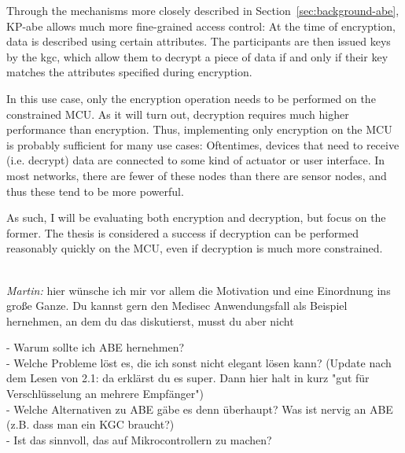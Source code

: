 Through the mechanisms more closely described in Section~\ref{sec:background-abe}, KP-\acrshort{abe} allows much more fine-grained access control:
At the time of encryption, data is described using certain \glspl{attribute}.
The participants are then issued keys by the \acrfull{kgc}, which allow them to decrypt a piece of data if and only if their key matches the attributes specified during encryption.

In this use case, only the encryption operation needs to be performed on the constrained MCU.
As it will turn out, decryption requires much higher performance than encryption.
Thus, implementing only encryption on the MCU is probably sufficient for many use cases:
Oftentimes, devices that need to receive (i.e. decrypt) data are connected to some kind of actuator or user interface. 
In most networks, there are fewer of these nodes than there are sensor nodes, and thus these tend to be more powerful. %

As such, I will be evaluating both encryption and decryption, but focus on the former.
The thesis is considered a success if decryption can be performed reasonably quickly on the MCU, even if decryption is much more constrained.



~\\

\emph{Martin: }
hier wünsche ich mir vor allem die Motivation und eine Einordnung ins große Ganze. Du kannst gern den Medisec Anwendungsfall als Beispiel hernehmen, an dem du das diskutierst, musst du aber nicht

- Warum sollte ich ABE hernehmen?\\ 
- Welche Probleme löst es, die ich sonst nicht elegant lösen kann? (Update nach dem Lesen von 2.1: da erklärst du es super. Dann hier halt in kurz "gut für Verschlüsselung an mehrere Empfänger") \\
- Welche Alternativen zu ABE gäbe es denn überhaupt? Was ist nervig an ABE (z.B. dass man ein KGC braucht?)\\
- Ist das sinnvoll, das auf Mikrocontrollern zu machen? \\

